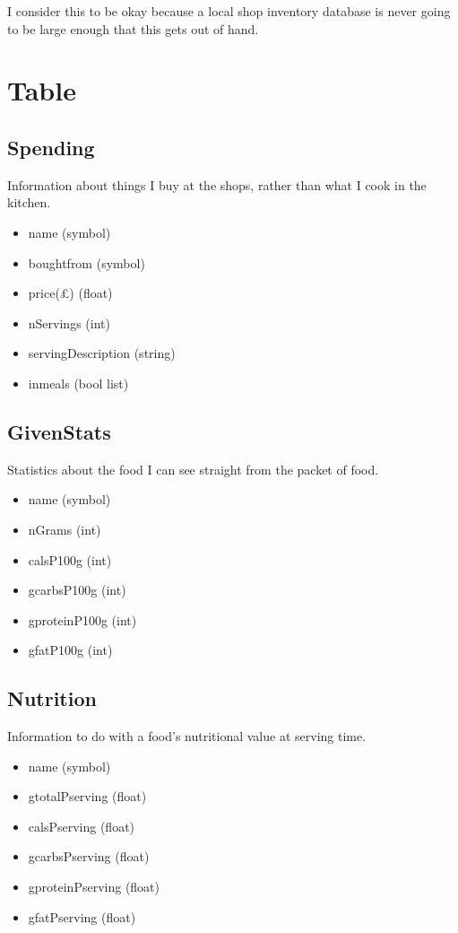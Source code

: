 \documentclass[a4paper]{article}
\begin{document}
I consider this to be okay because a local shop inventory database is 
never going to be large enough that this gets out of hand.

\section{Table}

\subsection{Spending}

Information about things I buy at the shops, rather than what I cook in the 
kitchen.

\begin{itemize}
  \item name (symbol)
  \item boughtfrom (symbol)
  \item price(£) (float)
  \item nServings (int)
  \item servingDescription (string)
  \item inmeals (bool list)
\end{itemize}

\subsection{GivenStats}

Statistics about the food I can see straight from the packet of food.

\begin{itemize}
  \item name (symbol)
  \item nGrams (int)
  \item calsP100g (int)
  \item gcarbsP100g (int)
  \item gproteinP100g (int)
  \item gfatP100g (int)
\end{itemize} 
  
\subsection{Nutrition}

Information to do with a food's nutritional value at serving time.

\begin{itemize}
  \item name (symbol)
  \item gtotalPserving (float)
  \item calsPserving (float)
  \item gcarbsPserving (float)
  \item gproteinPserving (float)
  \item gfatPserving (float)
\end{itemize}
\end{document}
